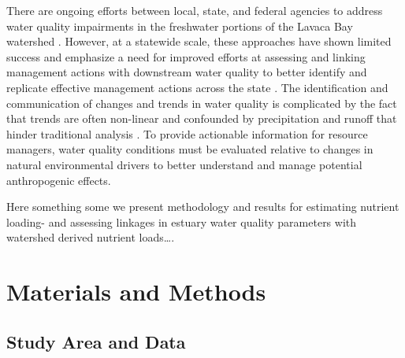 \documentclass[water,article,submit,oneauthor]{Definitions/mdpi}
\begin{document}
There are ongoing efforts between local, state, and federal agencies to
address water quality impairments in the freshwater portions of the
Lavaca Bay watershed
\citep{jainTechnicalSupportDocument2021, schramm_lavaca_2018, bertholdDirectMailingEducation2021}.
However, at a statewide scale, these approaches have shown limited
success and emphasize a need for improved efforts at assessing and
linking management actions with downstream water quality to better
identify and replicate effective management actions across the state
\citep{schrammTotalMaximumDaily2022}. The identification and
communication of changes and trends in water quality is complicated by
the fact that trends are often non-linear and confounded by
precipitation and runoff that hinder traditional analysis
\citep{wazniakLinkingWaterQuality2007, lloydMethodsDetectingChange2014}.
To provide actionable information for resource managers, water quality
conditions must be evaluated relative to changes in natural
environmental drivers to better understand and manage potential
anthropogenic effects.

Here something some we present methodology and results for estimating
nutrient loading- and assessing linkages in estuary water quality
parameters with watershed derived nutrient loads\ldots.

\hypertarget{materials-and-methods}{%
\section{Materials and Methods}\label{materials-and-methods}}

\hypertarget{study-area-and-data}{%
\subsection{Study Area and Data}\label{study-area-and-data}}
\end{document}
